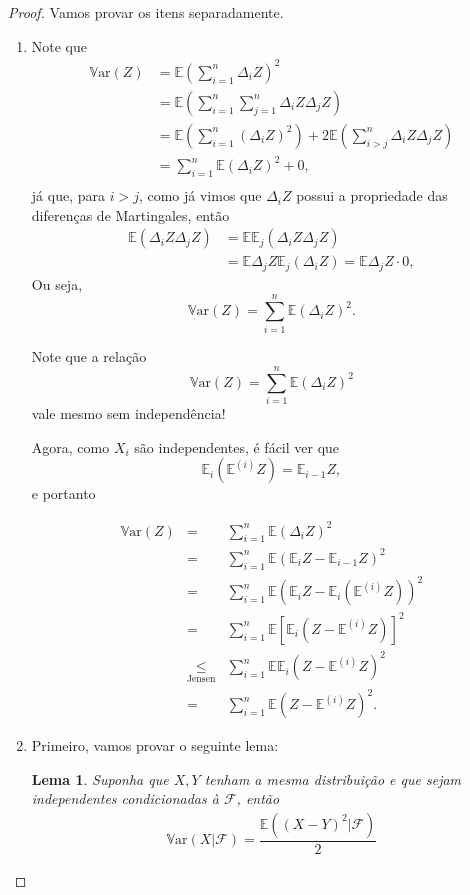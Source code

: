 \documentclass[12pt,a4paper,oneside]{book}
\newtheorem{lemma}[theorem]{Lema}
\theoremstyle{definition}
\theoremstyle{remark}
\numberwithin{equation}{section}
\newcommand{\E}{\mathbb{E}}
\newcommand{\ds}{\displaystyle}
\newcommand{\Var}{\mathbb{V}\text{ar}}
\begin{document}
\begin{proof} Vamos provar os itens separadamente.
\begin{enumerate}
\item  Note que
\begin{align*}
\Var(Z) & = \E\left(  \sum_{i=1}^n \Delta_iZ \right)^2\\
& = \E\left(  \sum_{i=1}^n\sum_{j=1}^n \Delta_iZ \Delta_jZ \right)\\
& = \E\left(  \sum_{i=1}^n (\Delta_i Z)^2 \right)+ 2\E\left( \sum_{i>j}^n\Delta_i Z\Delta_j Z \right)\\
& = \sum_{i=1}^n \E(\Delta_i Z)^2+ 0,\\
\end{align*}
já que, para $i>j$, como já vimos que $\Delta_i Z$ possui a propriedade das diferenças de Martingales, então 
\begin{align*}
\E\left( \Delta_i Z\Delta_j Z \right) & = \E\E_j\left( \Delta_i Z\Delta_j Z \right)\\
& = \E\Delta_j Z \E_j\left( \Delta_i Z\right) = \E\Delta_j Z \cdot 0,
\end{align*}
Ou seja,
$$ \Var(Z)  = \sum_{i=1}^n \E(\Delta_i Z)^2. $$

\begin{tcolorbox}[colback = yellow!60]
Note que a relação
$$ \Var(Z)  = \sum_{i=1}^n \E(\Delta_i Z)^2$$
vale mesmo sem independência!
\end{tcolorbox}

Agora, como $X_i$ são independentes, é fácil ver que
$$\E_i(\E^{(i)}Z) = \E_{i-1}Z, $$ e portanto

$$
\begin{array}{lcl}
\Var(Z) &=& \ds\sum_{i=1}^n \E(\Delta_i Z)^2\\ 
&=& \ds\sum_{i=1}^n \E(\E_i Z - \E_{i-1}Z)^2\\ 
&=& \ds\sum_{i=1}^n \E(\E_i Z - \E_i(\E^{(i)}Z))^2\\
&=& \ds\sum_{i=1}^n \E[\E_i( Z - \E^{(i)}Z)]^2\\
&\underset{\text{Jensen}}{\leq} & \ds\sum_{i=1}^n \E\E_i( Z - \E^{(i)}Z)^2\\
&= & \ds\sum_{i=1}^n \E( Z - \E^{(i)}Z)^2.
\end{array}
$$

\item Primeiro, vamos provar o seguinte lema:
\begin{lemma}
Suponha que $X,Y$ tenham a mesma distribuição e que sejam independentes condicionadas à $\mathcal{F}$, então
\begin{align*}
\Var(X|\mathcal{F}) = \dfrac{\E( (X-Y)^2|\mathcal{F})  }{2}
\end{align*}
\end{lemma}


\end{enumerate}
\end{proof}
\end{document}

